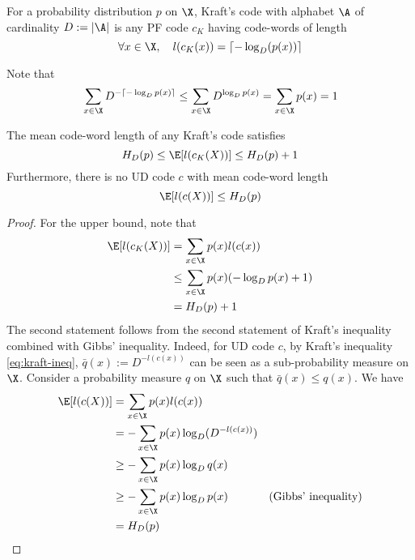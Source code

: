 \documentclass[toc]{../cs-classes/cs-classes}
\begin{document}
\begin{definition}
    For a probability distribution $p$ on $\X$, Kraft's code with alphabet $\A$ of cardinality $D:=|\A|$ is any PF code $c_K$ having code-words of length
    \begin{equation*}
        \forall x\in \X, \quad l(c_K(x))=\lceil -\log_D(p(x))\rceil
    \end{equation*}
\end{definition}

\begin{remark}
    Note that
    \begin{equation*}
        \sum_{x\in\X}D^{-\lceil-\log_Dp(x)\rceil}\leq \sum_{x\in\X}D^{\log_Dp(x)}=\sum_{x\in\X}p(x)=1
    \end{equation*}
\end{remark}

\begin{property}
    The mean code-word length of any Kraft's code satisfies
    \begin{equation}
        \label{eq:mean-length-kraft}
        H_D(p)\leq \E[l(c_K(X))]\leq H_D(p)+1
    \end{equation}
    Furthermore, there is no UD code $c$ with mean code-word length
    \begin{equation*}
        \E[l(c(X))]\leq H_D(p)
    \end{equation*}
\end{property}

\begin{proof}
    For the upper bound, note that
    \begin{equation*}
        \begin{aligned}
            \E[l(c_K(X))]&=\sum_{x\in\X}p(x)l(c(x))\\
            &\leq \sum_{x\in\X}p(x)(-\log_Dp(x)+1)\\
            &= H_D(p)+1
        \end{aligned}
    \end{equation*}
    The second statement follows from the second statement of Kraft's inequality combined with Gibbs' inequality. Indeed, for UD code $c$, by Kraft's inequality \eqref{eq:kraft-ineq}, $\bar{q}(x):=D^{-l(c(x))}$ can be seen as a sub-probability measure on $\X$. Consider a probability measure $q$ on $\X$ such that $\bar{q}(x)\leq q(x)$. We have
    \begin{equation*}
        \begin{aligned}
            \E[l(c(X))] &= \sum_{x\in\X}p(x)l(c(x))\\
            &= -\sum_{x\in\X}p(x)\log_D(D^{-l(c(x))})\\
            &\geq -\sum_{x\in\X}p(x)\log_Dq(x)\\
            &\geq -\sum_{x\in\X}p(x)\log_Dp(x) & \textnormal{(Gibbs' inequality)}\\
            &= H_D(p)
        \end{aligned}
    \end{equation*}
\end{proof}
\end{document}
